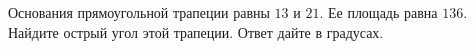 \begin{ex}
	\begin{condition}
		Основания прямоугольной трапеции равны \( 13  \) и \( 21 \). Ее площадь равна \( 136 \). Найдите острый угол этой трапеции. Ответ дайте в градусах.
	\end{condition}
\end{ex}